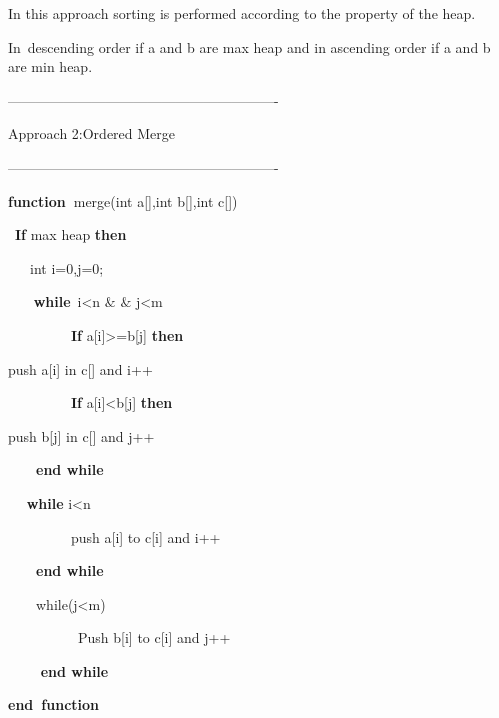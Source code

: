 \begin{multicols}{2}
\begin{enumerate}
In this approach sorting is performed according to the property of the heap.\par

In\ descending order  if a and b are max heap and in ascending order if a and b are min heap.\par

----------------------------------------------------------\par

Approach 2:Ordered Merge\par

----------------------------------------------------------\par

\textbf{function\  }merge(int a[],int b[],int c[])\par

\  \textbf{If }max heap \textbf{then}\par

\ \  \textbf{\  }int i=0,j=0;\par

\ \ \  \textbf{ while}\  i<n $\&$ $\&$  j<m\par

\ \ \ \ \ \ \ \ \  \textbf{If} a[i]>=b[j] \textbf{then}\par

\tab push a[i] in c[] and i++\par

\ \ \ \ \ \ \ \ \  \textbf{If} a[i]<b[j] \textbf{then}\par

\tab push b[j] in c[] and j++\par

\ \ \ \  \textbf{end while}\par

\ \  \textbf{ while} i<n\par

\ \ \ \ \ \ \ \ \  push a[i] to c[i] and i++\par

\ \ \ \  \textbf{end while}\par

\ \ \ \  while(j<m)\par

\ \ \ \ \ \ \ \ \ \  Push b[i] to c[i] and j++\par

\ \ \ \  \textbf{ end while}\par

\textbf{end\  function}\par


\end{enumerate}
\end{multicols}
